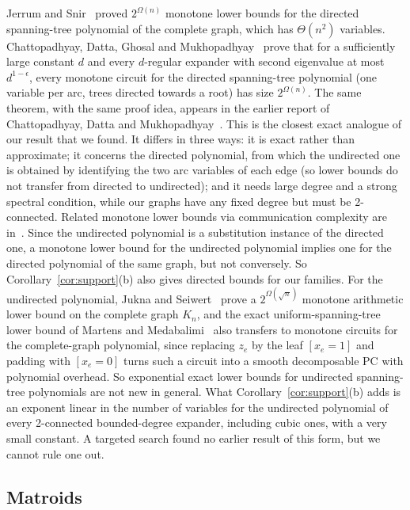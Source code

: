 Jerrum and Snir~\cite{JerrumSnir82} proved $2^{\Omega(n)}$ monotone lower bounds for the directed spanning-tree polynomial of the complete graph, which has $\Theta(n^2)$ variables. Chattopadhyay, Datta, Ghosal and Mukhopadhyay~\cite[Thm.~1.1]{CDGM22} prove that for a sufficiently large constant $d$ and every $d$-regular expander with second eigenvalue at most $d^{1-\epsilon}$, every monotone circuit for the directed spanning-tree polynomial (one variable per arc, trees directed towards a root) has size $2^{\Omega(n)}$. The same theorem, with the same proof idea, appears in the earlier report of Chattopadhyay, Datta and Mukhopadhyay~\cite[Thm.~1.1]{CDM20Negations}. This is the closest exact analogue of our result that we found. It differs in three ways: it is exact rather than approximate; it concerns the directed polynomial, from which the undirected one is obtained by identifying the two arc variables of each edge (so lower bounds do not transfer from directed to undirected); and it needs large degree and a strong spectral condition, while our graphs have any fixed degree but must be 2-connected. Related monotone lower bounds via communication complexity are in~\cite{ChattopadhyayDattaMukhopadhyay21}. Since the undirected polynomial is a substitution instance of the directed one, a monotone lower bound for the undirected polynomial implies one for the directed polynomial of the same graph, but not conversely. So Corollary~\ref{cor:support}(b) also gives directed bounds for our families. For the undirected polynomial, Jukna and Seiwert~\cite[Thm.~2]{JuknaSeiwert19} prove a $2^{\Omega(\sqrt n)}$ monotone arithmetic lower bound on the complete graph $K_n$, and the exact uniform-spanning-tree lower bound of Martens and Medabalimi~\cite[Thm.~37]{MartensMedabalimi14} also transfers to monotone circuits for the complete-graph polynomial, since replacing $z_e$ by the leaf $[x_e=1]$ and padding with $[x_e=0]$ turns such a circuit into a smooth decomposable PC with polynomial overhead. So exponential exact lower bounds for undirected spanning-tree polynomials are not new in general. What Corollary~\ref{cor:support}(b) adds is an exponent linear in the number of variables for the undirected polynomial of every 2-connected bounded-degree expander, including cubic ones, with a very small constant. A targeted search found no earlier result of this form, but we cannot rule one out.

\subsection{Matroids}

